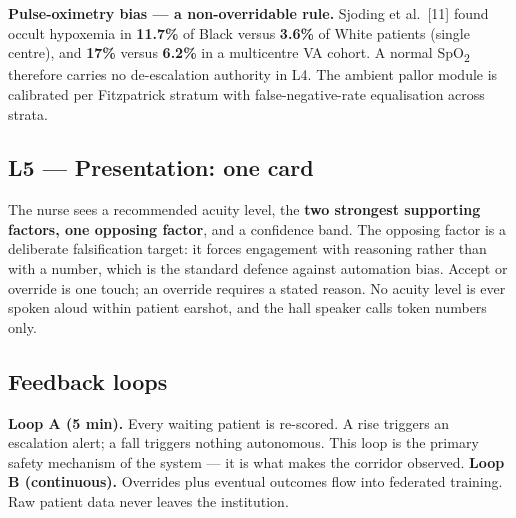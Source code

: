 \documentclass[10pt,a4paper,twocolumn]{article}
\begin{document}
\begin{tcolorbox}[mpbox,colframe=DeepPurple]
\textbf{Pulse-oximetry bias --- a non-overridable rule.} Sjoding et al.\
[11] found occult hypoxemia in \textbf{11.7\%} of Black versus
\textbf{3.6\%} of White patients (single centre), and \textbf{17\%} versus
\textbf{6.2\%} in a multicentre VA cohort. A normal SpO\textsubscript{2} therefore
carries no de-escalation authority in L4. The ambient pallor module is calibrated
per Fitzpatrick stratum with false-negative-rate equalisation across strata.
\end{tcolorbox}

\subsection{L5 --- Presentation: one card}
The nurse sees a recommended acuity level, the \textbf{two strongest supporting
factors, one opposing factor}, and a confidence band. The opposing factor is a
deliberate falsification target: it forces engagement with reasoning rather than with
a number, which is the standard defence against automation bias. Accept or override
is one touch; an override requires a stated reason. No acuity level is ever spoken
aloud within patient earshot, and the hall speaker calls token numbers only.

\subsection{Feedback loops}
\textbf{Loop A (5 min).} Every waiting patient is re-scored. A rise triggers an
escalation alert; a fall triggers nothing autonomous. This loop is the primary safety
mechanism of the system --- it is what makes the corridor observed.
\textbf{Loop B (continuous).} Overrides plus eventual outcomes flow into federated
training. Raw patient data never leaves the institution.
\end{document}
